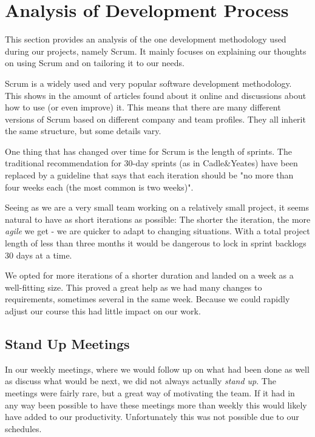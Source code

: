 \section{Analysis of Development Process}
This section provides an analysis of the one development methodology used during our projects, namely Scrum. It mainly focuses on explaining our thoughts on using Scrum and on tailoring it to our needs.
\label{sec:AnalysisOrganizational}

Scrum is a widely used and very popular software development methodology. This shows in the amount
of articles found about it online and discussions about how to use (or even improve) it. This means
that there are many different versions of Scrum based on different company and team profiles. They
all inherit the same structure, but some details vary.

One thing that has changed over time for Scrum is the length of sprints. The traditional recommendation
for 30-day sprints (as in Cadle\&Yeates\cite{caye}) have been replaced by a guideline that says that
each iteration should be "no more than four weeks each (the most common is two weeks)"\cite{scrumprime}.

Seeing as we are a very small team working on a relatively small project, it seems natural to have as 
short iterations as possible: The shorter the iteration, the more \emph{agile} we get - we are quicker
to adapt to changing situations. With a total project length of less than three months it would be
dangerous to lock in sprint backlogs 30 days at a time.

We opted for more iterations of a shorter duration and landed on a week as a well-fitting size. This
proved a great help as we had many changes to requirements, sometimes several in the same week. Because
we could rapidly adjust our course this had little impact on our work.

\subsection{Stand Up Meetings}

In our weekly meetings, where we would follow up on what had been done as well as discuss what would be
next, we did not always actually \emph{stand up}. The meetings were fairly rare, but a great way of
motivating the team. If it had in any way been possible to have these meetings more than weekly this would
likely have added to our productivity. Unfortunately this was not possible due to our schedules.


